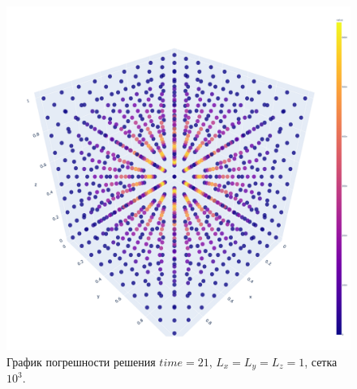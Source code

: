 \documentclass{article}
\begin{document}
\begin{figure}[!t]
\centering
    \includegraphics[width=\textwidth,trim=0 0 0 0,clip]{calc_sol_err_hm.pdf}
    \caption{График погрешности решения \(time = 21\), \(L_x = L_y = L_z = 1\), сетка \(10^3\).}
    \label{img:3}
\end{figure}
\end{document}
